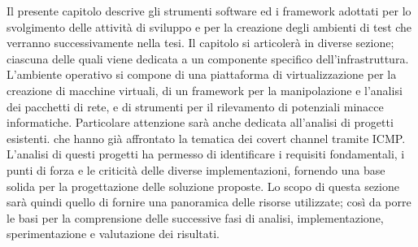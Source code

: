 Il presente capitolo descrive gli strumenti software ed i framework adottati per lo svolgimento delle attività di sviluppo e per la 
creazione degli ambienti di test che verranno  successivamente nella tesi. 
\vspace{2ex} \newline 
Il capitolo si articolerà in diverse sezione; ciascuna delle quali viene dedicata a un componente specifico dell'infrastruttura. 
L'ambiente operativo si compone di una piattaforma di virtualizzazione per la creazione di macchine virtuali, 
di un framework per la manipolazione e l'analisi dei pacchetti di rete, e di strumenti per il rilevamento di 
potenziali minacce informatiche.
Particolare attenzione sarà anche dedicata all'analisi di progetti esistenti. 
che hanno già affrontato la tematica dei covert channel tramite ICMP.
L'analisi di questi progetti ha permesso di identificare i requisiti fondamentali, i punti di forza e le criticità delle diverse 
implementazioni, fornendo una base solida per la progettazione delle soluzione proposte. 
\vspace{2ex} \newline 
Lo scopo di questa sezione sarà quindi quello di fornire una panoramica delle risorse utilizzate; così da porre le basi per la 
comprensione delle successive fasi di analisi, implementazione, sperimentazione e valutazione dei risultati. 
%

